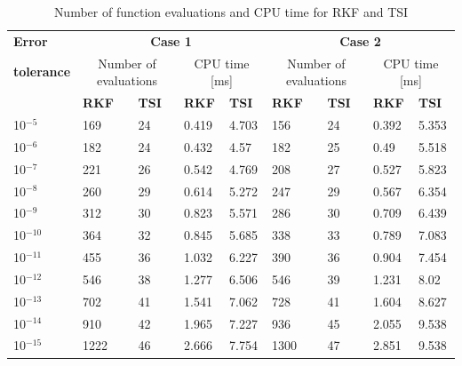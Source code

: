 \begin{table}[H]
\begin{center}
\caption{Number of function evaluations and CPU time for \ac{RKF} and \ac{TSI}}
\label{tab:RKFvsTSIfunctionEvaluationAndCPUtime}
\begin{tabular}{|l|p{1.5cm}|p{1.5cm}|l|l|p{1.5cm}|p{1.5cm}|l|l|}
\hline 
\textbf{Error}  & \multicolumn{4}{c|}{\textbf{Case 1}} & \multicolumn{4}{c|}{\textbf{Case 2}} \\ \cline{2-9}

\textbf{tolerance} & \multicolumn{2}{c|}{Number of evaluations} & \multicolumn{2}{c|}{CPU time [ms]}& \multicolumn{2}{c|}{Number of evaluations} & \multicolumn{2}{c|}{CPU time [ms]} \\ \cline{2-9}

& \textbf{\ac{RKF}} &
\textbf{\ac{TSI}} & \textbf{\ac{RKF}} & \textbf{\ac{TSI}} & \textbf{\ac{RKF}} &
\textbf{\ac{TSI}} & \textbf{\ac{RKF}} & \textbf{\ac{TSI}} \\ \hline \hline

10$^{-5}$ & 169 & 24 & 0.419 &4.703 &156 &24 &0.392 &5.353 \\ \hline
10$^{-6}$ & 182 & 24 & 0.432 &4.57 &182 &25 &0.49 &5.518 \\ \hline
10$^{-7}$ & 221 & 26 & 0.542 &4.769 &208 &27 &0.527 &5.823 \\ \hline
10$^{-8}$ & 260 & 29 & 0.614 &5.272 &247 &29 &0.567 &6.354 \\ \hline
10$^{-9}$ & 312 & 30 & 0.823 &5.571 &286 &30 &0.709 &6.439 \\ \hline
10$^{-10}$ & 364 & 32 & 0.845 &5.685 &338 &33 &0.789 &7.083 \\ \hline
10$^{-11}$ & 455 & 36 & 1.032 &6.227 &390 &36 &0.904 &7.454 \\ \hline
10$^{-12}$ & 546 & 38 & 1.277 &6.506 &546 &39 &1.231 &8.02 \\ \hline
10$^{-13}$ & 702 & 41 & 1.541 &7.062 &728 &41 &1.604 &8.627 \\ \hline
10$^{-14}$ & 910 & 42 & 1.965 &7.227 &936 &45 &2.055 &9.538 \\ \hline
10$^{-15}$ & 1222 & 46 & 2.666 &7.754 &1300 &47 &2.851 &9.538 \\ \hline


\end{tabular}
\end{center}
\end{table}

